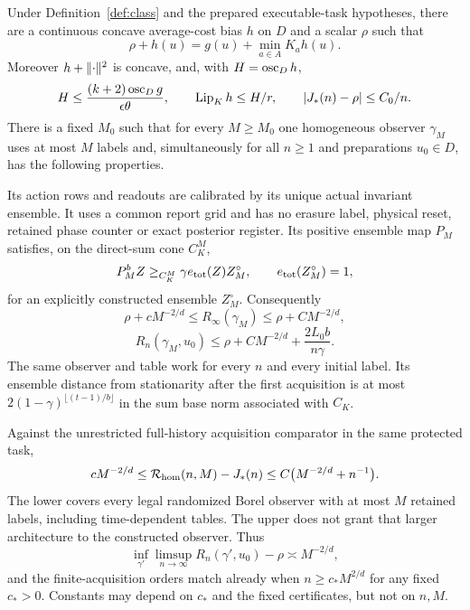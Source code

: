 \begin{theorem}\label{thm:main}
Under Definition~\ref{def:class} and the prepared executable-task hypotheses, there are a continuous concave average-cost bias $h$ on $D$ and a scalar $\rho$ such that
\begin{equation}\label{eq:acoe}
 \rho+h(u)=g(u)+\min_{a\in A}K_ah(u).
\end{equation}
Moreover $h+\lVert\cdot\rVert^2$ is concave, and, with $H=\operatorname{osc}_Dh$,
\begin{equation}\label{eq:bias-bounds}
 H\le\frac{(k+2)\operatorname{osc}_Dg}{\epsilon\theta},\qquad
 \operatorname{Lip}_Kh\le H/r,\qquad |J_*(n)-\rho|\le C_0/n.
\end{equation}
There is a fixed $M_0$ such that for every $M\ge M_0$ one homogeneous observer $\gamma_M$ uses at most $M$ labels and, simultaneously for all $n\ge1$ and preparations $u_0\in D$, has the following properties.

Its action rows and readouts are calibrated by its unique actual invariant ensemble. It uses a common report grid and has no erasure label, physical reset, retained phase counter or exact posterior register. Its positive ensemble map $P_M$ satisfies, on the direct-sum cone $C_K^M$,
\begin{equation}\label{eq:ensemble-minor}
 P_M^b Z\ge_{C_K^M}\gamma e_{\rm tot}(Z)Z_M^\circ,
 \qquad e_{\rm tot}(Z_M^\circ)=1,
\end{equation}
for an explicitly constructed ensemble $Z_M^\circ$. Consequently
\begin{equation}\label{eq:stationary-bound}
 \rho+cM^{-2/d}\le R_\infty(\gamma_M)\le\rho+CM^{-2/d},
\end{equation}
\begin{equation}\label{eq:entrance}
 R_n(\gamma_M,u_0)\le\rho+CM^{-2/d}+\frac{2L_0b}{n\gamma}.
\end{equation}
The same observer and table work for every $n$ and every initial label. Its ensemble distance from stationarity after the first acquisition is at most
$2(1-\gamma)^{\lfloor(t-1)/b\rfloor}$ in the sum base norm associated with $C_K$.

Against the unrestricted full-history acquisition comparator in the same protected task,
\begin{equation}\label{eq:finite-law}
 cM^{-2/d}\le\mathcal R_{\rm hom}(n,M)-J_*(n)
 \le C\bigl(M^{-2/d}+n^{-1}\bigr).
\end{equation}
The lower covers every legal randomized Borel observer with at most $M$ retained labels, including time-dependent tables. The upper does not grant that larger architecture to the constructed observer. Thus
\begin{equation}\label{eq:average-law}
 \inf_{\gamma'}\limsup_{n\to\infty}R_n(\gamma',u_0)-\rho
       \asymp M^{-2/d},
\end{equation}
and the finite-acquisition orders match already when $n\ge c_*M^{2/d}$ for any fixed $c_*>0$. Constants may depend on $c_*$ and the fixed certificates, but not on $n,M$.
\end{theorem}


